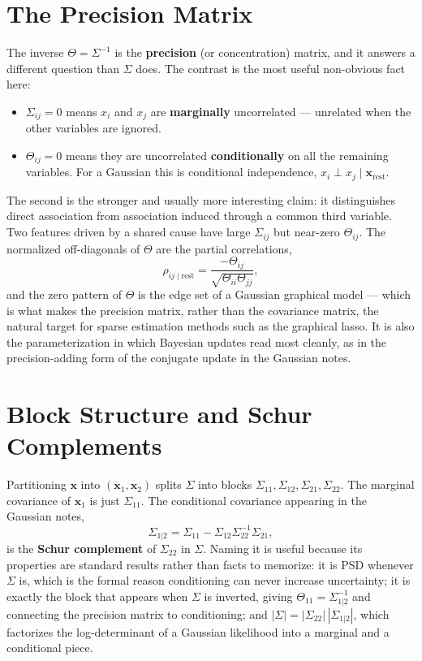 \documentclass[conference]{IEEEtran}
\begin{document}
\section*{The Precision Matrix}
The inverse $\Theta = \Sigma^{-1}$ is the \textbf{precision} (or concentration) matrix, and it answers a different question than $\Sigma$ does. The contrast is the most useful non-obvious fact here:
\begin{itemize}
    \item $\Sigma_{ij} = 0$ means $x_i$ and $x_j$ are \textbf{marginally} uncorrelated --- unrelated when the other variables are ignored.
    \item $\Theta_{ij} = 0$ means they are uncorrelated \textbf{conditionally} on all the remaining variables. For a Gaussian this is conditional independence, $x_i \perp x_j \mid \mathbf{x}_{\text{rest}}$.
\end{itemize}
The second is the stronger and usually more interesting claim: it distinguishes direct association from association induced through a common third variable. Two features driven by a shared cause have large $\Sigma_{ij}$ but near-zero $\Theta_{ij}$. The normalized off-diagonals of $\Theta$ are the partial correlations,
\begin{equation}
    \rho_{ij \mid \text{rest}} = \frac{-\Theta_{ij}}{\sqrt{\Theta_{ii}\Theta_{jj}}},
\end{equation}
and the zero pattern of $\Theta$ is the edge set of a Gaussian graphical model --- which is what makes the precision matrix, rather than the covariance matrix, the natural target for sparse estimation methods such as the graphical lasso. It is also the parameterization in which Bayesian updates read most cleanly, as in the precision-adding form of the conjugate update in the Gaussian notes.

\section*{Block Structure and Schur Complements}
Partitioning $\mathbf{x}$ into $(\mathbf{x}_1,\mathbf{x}_2)$ splits $\Sigma$ into blocks $\Sigma_{11}, \Sigma_{12}, \Sigma_{21}, \Sigma_{22}$. The marginal covariance of $\mathbf{x}_1$ is just $\Sigma_{11}$. The conditional covariance appearing in the Gaussian notes,
\begin{equation}
    \Sigma_{1|2} = \Sigma_{11} - \Sigma_{12}\Sigma_{22}^{-1}\Sigma_{21},
\end{equation}
is the \textbf{Schur complement} of $\Sigma_{22}$ in $\Sigma$. Naming it is useful because its properties are standard results rather than facts to memorize: it is PSD whenever $\Sigma$ is, which is the formal reason conditioning can never increase uncertainty; it is exactly the block that appears when $\Sigma$ is inverted, giving $\Theta_{11} = \Sigma_{1|2}^{-1}$ and connecting the precision matrix to conditioning; and $|\Sigma| = |\Sigma_{22}|\,|\Sigma_{1|2}|$, which factorizes the log-determinant of a Gaussian likelihood into a marginal and a conditional piece.
\end{document}
